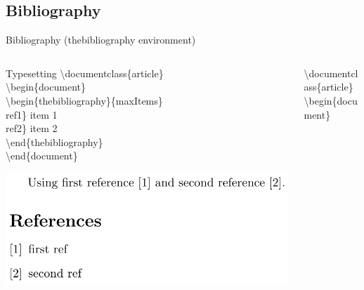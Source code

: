 \documentclass[10pt,xcolor={dvipsnames}]{beamer}
\begin{document}
	\subsection{Bibliography}
		\begin{frame}{Bibliography (thebibliography environment)}
	
			\begin{columns}[T]
				
				\begin{column}{.5 \textwidth}
					\onslide<2->
					\begin{block}{Typesetting}
						\textbackslash documentclass\{{\color{blue}article}\}\\
						\textbackslash begin\{{\color{blue}document}\}\\
							
							\quad\textbackslash begin\{{\color{orange}thebibliography}\}{\color{orange}\{maxItems\}}\\
								ref1{\color{orange}\}} item 1\\
								ref2{\color{orange}\}} item 2\\
							\quad\textbackslash end\{{\color{orange}thebibliography}\}\\
						
						\textbackslash end\{{\color{blue}document}\}\\
					\end{block}
				
					\includegraphics[width=1\textwidth]{Images/reference.png}
				\end{column}
				
				\begin{column}{.5 \textwidth}
					\begin{example}
						\textbackslash documentclass\{{\color{blue}article}\}\\
						\textbackslash begin\{{\color{blue}document}\}\\
						

\end{example}
\end{column}
\end{columns}
\end{frame}
\end{document}
